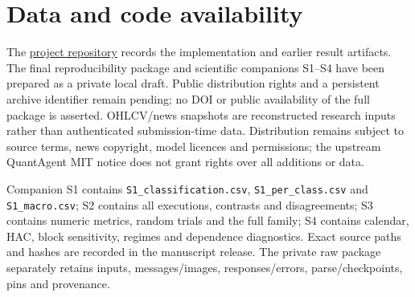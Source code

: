 \section*{Data and code availability}
The \href{https://github.com/DungPhanHoangg05/A-Multi-Agent-Large-Language-Model-Approach-to-Price-Driven-Stock-Trading-in-the-Vietnamese-Stock-Ma}{project repository} records the implementation and earlier result artifacts. The final reproducibility package and scientific companions S1--S4 have been prepared as a private local draft. Public distribution rights and a persistent archive identifier remain pending; no DOI or public availability of the full package is asserted. OHLCV/news snapshots are reconstructed research inputs rather than authenticated submission-time data. Distribution remains subject to source terms, news copyright, model licences and permissions; the upstream QuantAgent MIT notice does not grant rights over all additions or data.

Companion S1 contains \texttt{S1\_classification.csv}, \texttt{S1\_per\_class.csv} and \texttt{S1\_macro.csv}; S2 contains all executions, contrasts and disagreements; S3 contains numeric metrics, random trials and the full family; S4 contains calendar, HAC, block sensitivity, regimes and dependence diagnostics. Exact source paths and hashes are recorded in the manuscript release. The private raw package separately retains inputs, messages/images, responses/errors, parse/checkpoints, pins and provenance.
